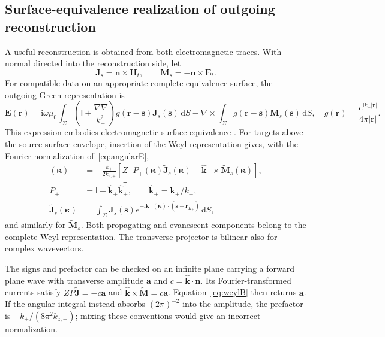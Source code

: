 \documentclass[11pt,a4paper]{article}
\newcommand{\vct}[1]{\bm{#1}}
\newcommand{\kap}{\vct\kappa}
\newcommand{\dd}{\mathrm d}
\newcommand{\ii}{\mathrm i}
\newcommand{\Id}{\mathsf I}
\newcommand{\B}{\mathcal B}
\numberwithin{equation}{section}
\begin{document}
\subsection{Surface-equivalence realization of outgoing reconstruction}
\label{sec:equivalence}

A useful reconstruction is obtained from both electromagnetic traces. With
normal directed into the reconstruction side, let
\begin{equation}
 \vct J_s=\vct n\times\vct H_t,\qquad
 \vct M_s=-\vct n\times\vct E_t.
\end{equation}
For compatible data on an appropriate complete equivalence surface, the
outgoing Green representation is
\begin{equation}
 \vct E(\vct r)=\ii\omega\mu_0\int_\Sigma
 \left(\Id+\frac{\nabla\nabla}{k_+^2}\right)g(\vct r-\vct s)
 \vct J_s(\vct s)\,\dd S
 -\nabla\times\int_\Sigma g(\vct r-\vct s)\vct M_s(\vct s)\,\dd S,
 \quad g(\vct r)=\frac{e^{\ii k_+|\vct r|}}{4\pi|\vct r|}.
 \label{eq:green}
\end{equation}
This expression embodies electromagnetic surface equivalence
\cite{Schelkunoff1936,StrattonChu1939}. For targets above the source-surface
envelope, insertion of the Weyl representation gives, with the Fourier
normalization of~\eqref{eq:angularE},
\begin{align}
 [\B^{\rm eq}_{+,\Sigma}\vct U_t](\kap)
 &=-\frac{k_+}{2k_{z,+}}
 \left[Z_+P_+(\kap)\widetilde{\vct J}_s(\kap)
       -\widehat{\vct k}_+\times\widetilde{\vct M}_s(\kap)\right],
 \label{eq:weylB}\\
 P_+&=\Id-\widehat{\vct k}_+\widehat{\vct k}_+^{\mathsf T},\qquad
 \widehat{\vct k}_+=\vct k_+/k_+,\\
 \widetilde{\vct J}_s(\kap)&=\int_\Sigma\vct J_s(\vct s)
 e^{-\ii\vct k_+(\kap)\cdot(\vct s-\vct r_{\Pi_+})}\,\dd S,
 \label{eq:currenttransform}
\end{align}
and similarly for $\widetilde{\vct M}_s$. Both propagating and evanescent
components belong to the complete Weyl representation. The transverse
projector is bilinear also for complex wavevectors.

The signs and prefactor can be checked on an infinite plane carrying a forward
plane wave with transverse amplitude $\vct a$ and
$c=\widehat{\vct k}\cdot\vct n$. Its Fourier-transformed currents satisfy
$ZP\widetilde{\vct J}=-c\vct a$ and
$\widehat{\vct k}\times\widetilde{\vct M}=c\vct a$.
Equation~\eqref{eq:weylB} then returns $\vct a$.
If the angular integral instead absorbs $(2\pi)^{-2}$ into the amplitude,
the prefactor is $-k_+/(8\pi^2k_{z,+})$; mixing these conventions would give
an incorrect normalization.
\end{document}
